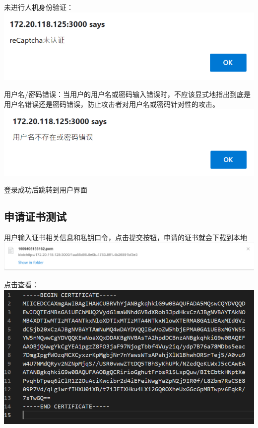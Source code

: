 \documentclass{ctexart}
\begin{document}
未进行人机身份验证：\\

\includegraphics[width=\textwidth]{Clipboard_2021-01-02-14-12-51.png}


用户名/密码错误：当用户的用户名或密码输入错误时，不应该显式地指出到底是用户名错误还是密码错误，防止攻击者对用户名或密码针对性的攻击。\\
\includegraphics[width=\textwidth]{Clipboard_2021-01-02-14-41-45.png}



登录成功后跳转到用户界面
\subsection{申请证书测试}

用户输入证书相关信息和私钥口令，点击提交按钮，申请的证书就会下载到本地 \\

\includegraphics[width=\textwidth]{Clipboard_2021-01-02-14-48-51.png}

点击查看：\\

\includegraphics[width=\textwidth]{Clipboard_2021-01-02-14-47-56.png}
\end{document}
